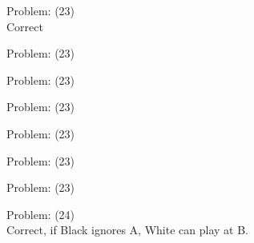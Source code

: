 \documentclass[11pt]{article}
\begin{document}
\begin{minipage}[t]{0.5\textwidth}
  {\centering
  
Problem: (23)\\
Correct\\
  }
\end{minipage}
\begin{minipage}[t]{0.5\textwidth}
  {\centering
  
Problem: (23)\\
  }
\end{minipage}
\begin{minipage}[t]{0.5\textwidth}
  {\centering
  
Problem: (23)\\
  }
\end{minipage}
\begin{minipage}[t]{0.5\textwidth}
  {\centering
  
Problem: (23)\\
  }
\end{minipage}
\begin{minipage}[t]{0.5\textwidth}
  {\centering
  
Problem: (23)\\
  }
\end{minipage}
\begin{minipage}[t]{0.5\textwidth}
  {\centering
  
Problem: (23)\\
  }
\end{minipage}
\begin{minipage}[t]{0.5\textwidth}
  {\centering
  
Problem: (23)\\
  }
\end{minipage}
\begin{minipage}[t]{0.5\textwidth}
  {\centering
  
Problem: (24)\\
Correct, if Black ignores A, White can play at B.\\
  }
\end{minipage}
\end{document}
